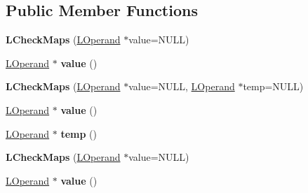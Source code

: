 \subsection*{Public Member Functions}
\begin{DoxyCompactItemize}
\item 
{\bfseries L\+Check\+Maps} (\hyperlink{classv8_1_1internal_1_1_l_operand}{L\+Operand} $\ast$value=N\+U\+LL)\hypertarget{classv8_1_1internal_1_1_l_check_maps_a295bd750be5836ee2b03ec4c56192d16}{}\label{classv8_1_1internal_1_1_l_check_maps_a295bd750be5836ee2b03ec4c56192d16}

\item 
\hyperlink{classv8_1_1internal_1_1_l_operand}{L\+Operand} $\ast$ {\bfseries value} ()\hypertarget{classv8_1_1internal_1_1_l_check_maps_a0ce50e2f6650671c56bebe236ebc24cf}{}\label{classv8_1_1internal_1_1_l_check_maps_a0ce50e2f6650671c56bebe236ebc24cf}

\item 
{\bfseries L\+Check\+Maps} (\hyperlink{classv8_1_1internal_1_1_l_operand}{L\+Operand} $\ast$value=N\+U\+LL, \hyperlink{classv8_1_1internal_1_1_l_operand}{L\+Operand} $\ast$temp=N\+U\+LL)\hypertarget{classv8_1_1internal_1_1_l_check_maps_a3d24cf0ba115948486729e6624265cb3}{}\label{classv8_1_1internal_1_1_l_check_maps_a3d24cf0ba115948486729e6624265cb3}

\item 
\hyperlink{classv8_1_1internal_1_1_l_operand}{L\+Operand} $\ast$ {\bfseries value} ()\hypertarget{classv8_1_1internal_1_1_l_check_maps_a0ce50e2f6650671c56bebe236ebc24cf}{}\label{classv8_1_1internal_1_1_l_check_maps_a0ce50e2f6650671c56bebe236ebc24cf}

\item 
\hyperlink{classv8_1_1internal_1_1_l_operand}{L\+Operand} $\ast$ {\bfseries temp} ()\hypertarget{classv8_1_1internal_1_1_l_check_maps_a92f3028bc206c320b88c7f8116a82904}{}\label{classv8_1_1internal_1_1_l_check_maps_a92f3028bc206c320b88c7f8116a82904}

\item 
{\bfseries L\+Check\+Maps} (\hyperlink{classv8_1_1internal_1_1_l_operand}{L\+Operand} $\ast$value=N\+U\+LL)\hypertarget{classv8_1_1internal_1_1_l_check_maps_a295bd750be5836ee2b03ec4c56192d16}{}\label{classv8_1_1internal_1_1_l_check_maps_a295bd750be5836ee2b03ec4c56192d16}

\item 
\hyperlink{classv8_1_1internal_1_1_l_operand}{L\+Operand} $\ast$ {\bfseries value} ()\hypertarget{classv8_1_1internal_1_1_l_check_maps_a0ce50e2f6650671c56bebe236ebc24cf}{}\label{classv8_1_1internal_1_1_l_check_maps_a0ce50e2f6650671c56bebe236ebc24cf}


\end{DoxyCompactItemize}
